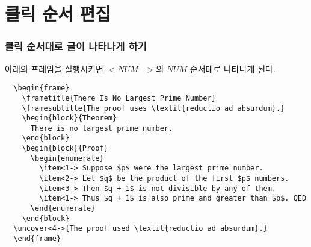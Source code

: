 \documentclass[hyperref={unicode}]{beamer}
\begin{document}
\section{클릭 순서 편집}


\begin{frame}[fragile]
\frametitle{클릭 순서대로 글이 나타나게 하기}

\begin{block}{}
  아래의 프레임을 실행시키면 $<NUM->$의 $NUM$ 순서대로 나타나게 된다. 
\end{block}

\begin{block}{}
\tiny
 \begin{center}
 \begin{verbatim}
  \begin{frame} 
    \frametitle{There Is No Largest Prime Number} 
    \framesubtitle{The proof uses \textit{reductio ad absurdum}.} 
    \begin{block}{Theorem} 
      There is no largest prime number. 
    \end{block} 
    \begin{block}{Proof} 
      \begin{enumerate} 
        \item<1-> Suppose $p$ were the largest prime number. 
        \item<2-> Let $q$ be the product of the first $p$ numbers. 
        \item<3-> Then $q + 1$ is not divisible by any of them. 
        \item<1-> Thus $q + 1$ is also prime and greater than $p$. QED
      \end{enumerate} 
    \end{block} 
  \uncover<4->{The proof used \textit{reductio ad absurdum}.} 
  \end{frame} 
 \end{verbatim}
 \end{center}
\end{block}

\end{frame}
\end{document}
